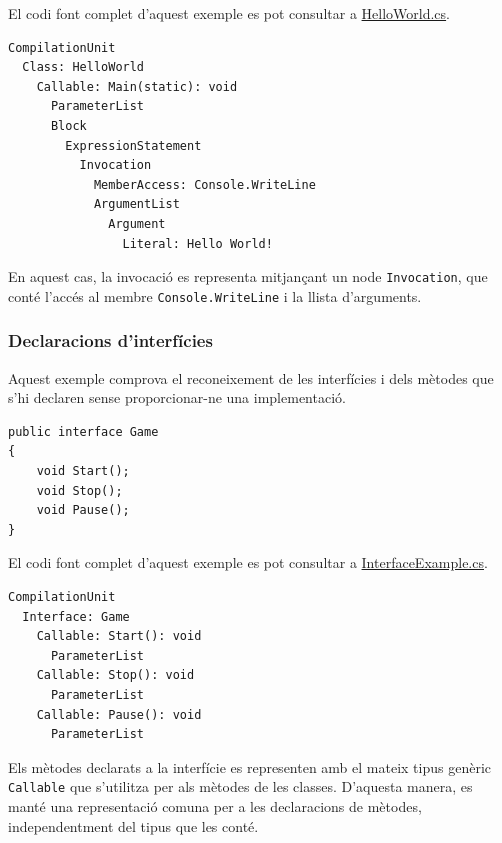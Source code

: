 El codi font complet d'aquest exemple es pot consultar
a \href{https://github.com/PauDiazM/static-code-analysis-tfg/blob/main/code_samples/examples/HelloWorld.cs}{HelloWorld.cs}.

\begin{lstlisting}[style=output,
    caption={Sortida resumida del mòdul Parser per a una invocació},
    label={lst:invocation-output}]
CompilationUnit
  Class: HelloWorld
    Callable: Main(static): void
      ParameterList
      Block
        ExpressionStatement
          Invocation
            MemberAccess: Console.WriteLine
            ArgumentList
              Argument
                Literal: Hello World!
\end{lstlisting}

En aquest cas, la invocació es representa mitjançant un node \texttt{Invocation},
que conté l'accés al membre \texttt{Console.WriteLine} i la llista d'arguments.

\subsubsection*{Declaracions d'interfícies}
\label{sec:parser-interfaces}

Aquest exemple comprova el reconeixement de les interfícies i dels mètodes que s'hi
declaren sense proporcionar-ne una implementació.

\begin{lstlisting}[style=code,
    caption={Codi font de l'exemple d'interfície},
    label={lst:interface-source}]
public interface Game
{
    void Start();
    void Stop();
    void Pause();
}
\end{lstlisting}

El codi font complet d'aquest exemple es pot consultar
a \href{https://github.com/PauDiazM/static-code-analysis-tfg/blob/main/code_samples/examples/InterfaceExample.cs}{InterfaceExample.cs}.

\begin{lstlisting}[style=output,
    caption={Sortida resumida del mòdul Parser per a una interfície},
    label={lst:interface-output}]
CompilationUnit
  Interface: Game
    Callable: Start(): void
      ParameterList
    Callable: Stop(): void
      ParameterList
    Callable: Pause(): void
      ParameterList
\end{lstlisting}

Els mètodes declarats a la interfície es representen amb el mateix tipus genèric
\texttt{Callable} que s'utilitza per als mètodes de les classes. D'aquesta manera,
es manté una representació comuna per a les declaracions de mètodes, independentment
del tipus que les conté.

